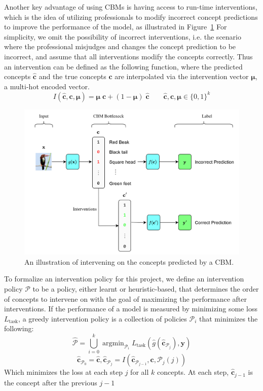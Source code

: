 \documentclass[../main.tex]{subfiles}
\begin{document}
Another key advantage of using CBMs is having access to 
run-time interventions, which is the idea of utilizing professionals
to modify incorrect concept predictions to improve the 
performance of the model, as illustrated in Figure~\ref{fig:cbm-interventions} For simplicity, we omit the
possibility of incorrect interventions, i.e. the scenario
where the professional misjudges and changes the concept prediction to be incorrect,
and assume that
all interventions modify the concepts correctly. Thus an intervention
can be defined as the following function, where
the predicted concepts $\hat{\mathbf{c}}$ and the true concepts $\mathbf{c}$ are interpolated
via the intervention vector $\bm{\mu}$, a multi-hot encoded vector.
\[I(\hat{\mathbf{c}}, \mathbf{c}, \bm{\mu}) = 
\bm{\mu} \; \mathbf{c} + (1 - \bm{\mu}) \; \hat{\mathbf{c}} \qquad \hat{\mathbf{c}}, \mathbf{c}, \bm{\mu} \in \{0, 1\}^k\]

\begin{figure}[!h]
    \centering
    \includegraphics[width=\textwidth]{figs/background/cbm_interventions.png}
    \caption{An illustration of intervening on the concepts predicted by a CBM.}
    \label{fig:cbm-interventions}
\end{figure}

To formalize an intervention policy for this
project, we define an intervention policy $\mathcal{P}$ to be a policy, either learnt
or heuristic-based, that determines the order of concepts to intervene 
on with the goal of maximizing the performance after interventions.
If the performance of a model is measured by minimizing some loss $L_{\text{task}}$,
a greedy intervention policy is a collection of policies $\mathcal{P}_i$ that minimizes the following:
\[\hat{\mathcal{P}} = \bigcup_{i=0}^k \mathop{\mathrm{argmin}}_{\mathcal{P}_i} L_{\text{task}}(\hat{g}(\hat{\mathbf{c}}_{\mathcal{P}_j}), \mathbf{y}) \]
\[\hat{\mathbf{c}}_{\mathcal{P}_0} = \hat{\mathbf{c}}, \hat{\mathbf{c}}_{\mathcal{P}_j} = I(\hat{\mathbf{c}}_{\mathcal{P}_{j-1}}, \mathbf{c}, \mathcal{P}_j(j))\]
Which minimizes the loss at each step $j$ for all $k$ concepts. At each
step, $\hat{\mathbf{c}}_{j-1}$ is the concept after the previous $j-1$ 
\end{document}
